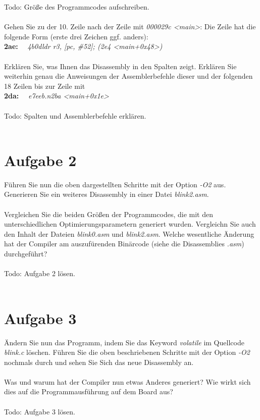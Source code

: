 Todo: Grö\ss{}e des Programmcodes aufschreiben.\\ \\
Gehen Sie zu der 10. Zeile nach der Zeile mit \textit{000029c <main>}: Die Zeile hat die folgende Form (erste drei Zeichen ggf. anders):\\
\textbf{2ae:}~~ \textit{4b0d\quad \quad \quad ldr \quad r3, [pc, \#52]\quad \quad ; (2e4 <main+0x48>)}\\ \\
Erklären Sie, was Ihnen das Disassembly in den Spalten zeigt. Erklären Sie weiterhin genau die Anweisungen der Assemblerbefehle dieser und der folgenden 18 Zeilen bis zur Zeile mit\\
\textbf{2da:}~~ \textit{e7ee\quad \quad \quad b.n\quad 2ba <main+0x1e>\quad \quad }\\ \\
Todo: Spalten und Assemblerbefehle erklären.\\ \\
\section{Aufgabe 2}
Führen Sie nun die oben dargestellten Schritte mit der Option \textit{-O2} aus. Generieren Sie ein weiteres Disassembly in einer Datei \textit{blink2.asm}.\\ \\
Vergleichen Sie die beiden Grö\ss{}en der Programmcodes, die mit den unterschiedlichen Optimierungsparametern generiert wurden. Vergleichn Sie auch den Inhalt der Dateien \textit{blink0.asm} und \textit{blink2.asm}. Welche wesentliche Änderung hat der Compiler am auszufürenden Binärcode (siehe die Disassemblies \textit{.asm}) durchgeführt?\\ \\
Todo: Aufgabe 2 lösen.\\ \\
\section{Aufgabe 3}
Ändern Sie nun das Programm, indem Sie das Keyword \textit{volatile} im Quellcode \textit{blink.c} löschen. Führen Sie die oben beschriebenen Schritte mit der Option \textit{-O2} nochmals durch und sehen Sie Sich das neue Disassembly an.\\ \\
Was und warum hat der Compiler nun etwas Anderes generiert? Wie wirkt sich dies auf die Programmausführung auf dem Board aus?\\ \\
Todo: Aufgabe 3 lösen.\\
